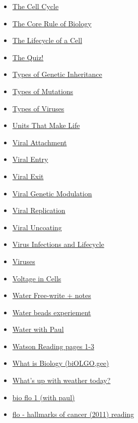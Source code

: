 \documentclass[11pt]{article}
\begin{document}
\begin{itemize}
\begin{itemize}
\item \href{bio101/KBhBIO101CellCycle.org}{The Cell Cycle}
\item \href{bio101/KBhBIO101CoreRuleofBio.org}{The Core Rule of Biology}
\item \href{bio101/KBhBIO101CellLifecycle.org}{The Lifecycle of a Cell}
\item \href{bio101/KBxLittleMoreBIO.org}{The Quiz!}
\item \href{bio101/KBhBIO101GeneticInheritance.org}{Types of Genetic Inheritance}
\item \href{bio101/KBhBIO101TypesOfMutations.org}{Types of Mutations}
\item \href{bio101/KBhBIO101TypesOfViruses.org}{Types of Viruses}
\item \href{bio101/KBhBIO101UnitsThatMakeLife.org}{Units That Make Life}
\item \href{bio101/KBhBIO101ViralAttachment.org}{Viral Attachment}
\item \href{bio101/KBhBIO101ViralEntry.org}{Viral Entry}
\item \href{bio101/KBhBIO101ViralExit.org}{Viral Exit}
\item \href{bio101/KBhBIO101ViralGeneticModulationMutation.org}{Viral Genetic Modulation}
\item \href{bio101/KBhBIO101ViralReplication.org}{Viral Replication}
\item \href{bio101/KBhBIO101ViralUncoating.org}{Viral Uncoating}
\item \href{bio101/KBhBIO101ViralInfection.org}{Virus Infections and Lifecycle}
\item \href{bio101/KBhBIO101Viruses.org}{Viruses}
\item \href{bio101/KBrefCellularVoltage.org}{Voltage in Cells}
\item \href{bio101/KBWaterFreewrite.org}{Water Free-write + notes}
\item \href{bio101/KBe20bio101floTripBreakout.org}{Water beads experiement}
\item \href{bio101/KBhBIO101Watah.org}{Water with Paul}
\item \href{bio101/KB20200826173515.org}{Watson Reading pages 1-3}
\item \href{bio101/KBhBIO101WhatsBio.org}{What is Biology (biOLGO,gee)}
\item \href{bio101/KBBIO101YelloSky.org}{What's up with weather today?}
\item \href{bio101/KBe21bio101flo1.org}{bio flo 1 (with paul)}
\item \href{bio101/KBe21bio201floHallmarksOfCancer.org}{flo - hallmarks of cancer (2011) reading}

\end{itemize}
\end{itemize}
\end{document}
